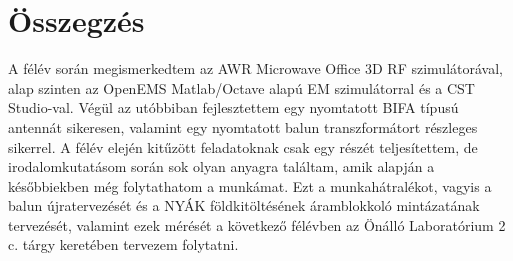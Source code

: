 \chapter{Összegzés}
A félév során megismerkedtem az AWR Microwave Office 3D RF szimulátorával, alap szinten az OpenEMS Matlab/Octave alapú EM szimulátorral és a CST Studio-val. Végül az utóbbiban fejlesztettem egy nyomtatott BIFA típusú antennát sikeresen, valamint egy nyomtatott balun transzformátort részleges sikerrel. A félév elején kitűzött feladatoknak csak egy részét teljesítettem, de irodalomkutatásom során sok olyan anyagra találtam, amik alapján a későbbiekben még folytathatom a munkámat. Ezt a munkahátralékot, vagyis a balun újratervezését és a NYÁK földkitöltésének áramblokkoló mintázatának tervezését, valamint ezek mérését a következő félévben az Önálló Laboratórium 2 c. tárgy keretében tervezem folytatni.